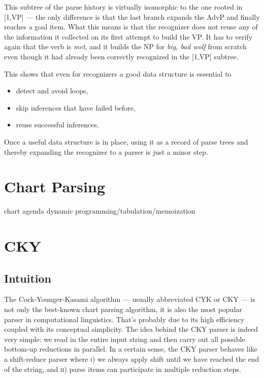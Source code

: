\begin{examplebox}
\begin{center}
    \end{center}
    This subtree of the parse history is virtually isomorphic to the one rooted in [1,\psep VP] --- the only difference is that the last branch expands the AdvP and finally reaches a goal item.
    What this means is that the recognizer does not reuse any of the information it collected on its first attempt to build the VP\@.
    It has to verify again that the verb is \emph{met}, and it builds the NP for \emph{big, bad wolf} from scratch even though it had already been correctly recognized in the [1,\psep VP] subtree.
\end{examplebox}
%
This shows that even for recognizers a good data structure is essential to
%
\begin{itemize}
    \item detect and avoid loops,
    \item skip inferences that have failed before,
    \item reuse successful inferences.
\end{itemize}
%
Once a useful data structure is in place, using it as a record of parse trees and thereby expanding the recognizer to a parser is just a minor step.

\section{Chart Parsing}

chart
agenda
dynamic programming/tabulation/memoization

\section{CKY}

\subsection{Intuition}

The Cock-Younger-Kasami algorithm --- usually abbreviated CYK or CKY --- is not only the best-known chart parsing algorithm, it is also the most popular parser in computational linguistics.
That's probably due to its high efficiency coupled with its conceptual simplicity.
The idea behind the CKY parser is indeed very simple: we read in the entire input string and then carry out all possible bottom-up reductions in parallel.
In a certain sense, the CKY parser behaves like a shift-reduce parser where \textsc{i}) we always apply shift until we have reached the end of the string, and \textsc{ii}) parse items can participate in multiple reduction steps.

